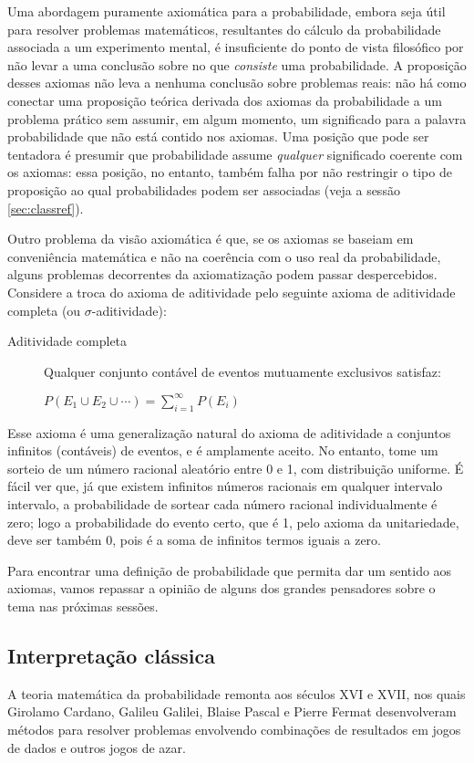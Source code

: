 \documentclass[12pt,a4paper]{article}
\begin{document}
Uma abordagem puramente axiomática para a probabilidade, embora seja útil para resolver problemas matemáticos, resultantes do
cálculo da probabilidade associada a um experimento mental, é insuficiente do ponto de vista filosófico por não 
levar a uma conclusão sobre no que {\em consiste} uma probabilidade. A proposição desses axiomas não leva a nenhuma conclusão 
sobre problemas reais: não há como conectar uma proposição teórica derivada dos axiomas da probabilidade a um problema
prático sem assumir, em algum momento, um significado para a palavra probabilidade que não está contido nos axiomas. Uma posição
que pode ser tentadora é presumir que probabilidade assume {\em qualquer} significado coerente com os axiomas: essa posição,
no entanto, também falha por não restringir o tipo de proposição ao qual probabilidades podem ser associadas (veja a sessão
\ref{sec:classref}). 

Outro problema da visão axiomática é que, se os axiomas se baseiam em conveniência matemática e não na coerência com o uso 
real da probabilidade, alguns problemas decorrentes da axiomatização podem passar despercebidos. Considere a troca do axioma
de aditividade pelo seguinte axioma de aditividade completa (ou $\sigma$-aditividade):

\begin{description}
	\item[Aditividade completa] Qualquer conjunto contável de eventos mutuamente exclusivos satisfaz:

		$P(E_1 \cup E_2 \cup \cdots) = \sum_{i=1}^\infty P(E_i)$
\end{description}

Esse axioma é uma generalização natural do axioma de aditividade a conjuntos infinitos (contáveis) de eventos, e é amplamente
aceito. No entanto, tome um sorteio de um número racional aleatório entre 0 e 1, com distribuição uniforme. É fácil ver que,
já que existem infinitos números racionais em qualquer intervalo intervalo,
a probabilidade de sortear cada número racional individualmente é zero; logo a probabilidade do evento certo, que é 1, 
pelo axioma da unitariedade, deve ser também 0, pois é a soma de infinitos termos iguais a zero.

Para encontrar uma definição de probabilidade que permita dar um sentido aos axiomas, vamos repassar a opinião de alguns dos 
grandes pensadores sobre o tema nas próximas sessões.

\subsection{Interpretação clássica}
A teoria matemática da probabilidade remonta aos séculos XVI e XVII, nos quais Girolamo Cardano, Galileu Galilei, Blaise Pascal
e Pierre Fermat desenvolveram métodos para resolver problemas envolvendo combinações de resultados em jogos de dados e outros
jogos de azar. 
\end{document}
